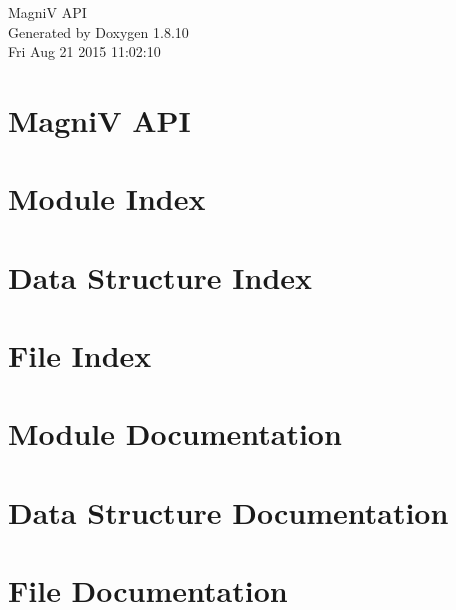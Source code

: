 \documentclass[twoside]{book}
\newcommand{\+}{\discretionary{\mbox{\scriptsize$\hookleftarrow$}}{}{}}
\newcommand{\clearemptydoublepage}{%
  \newpage{\pagestyle{empty}\cleardoublepage}%
}
\begin{document}
\hypersetup{pageanchor=false,
             bookmarks=true,
             bookmarksnumbered=true,
             pdfencoding=unicode
            }
\begin{titlepage}
\vspace*{7cm}
\begin{center}%
{\Large Magni\+V A\+P\+I }\\
\vspace*{1cm}
{\large Generated by Doxygen 1.8.10}\\
\vspace*{0.5cm}
{\small Fri Aug 21 2015 11:02:10}\\
\end{center}
\end{titlepage}
\clearemptydoublepage
\tableofcontents
\clearemptydoublepage
{}
\hypersetup{pageanchor=true}

\chapter{Magni\+V A\+P\+I}
\label{index}\hypertarget{index}{}
\chapter{Module Index}

\chapter{Data Structure Index}

\chapter{File Index}

\chapter{Module Documentation}





\chapter{Data Structure Documentation}
























\chapter{File Documentation}







\backmatter
\newpage
{}
\clearemptydoublepage
{}
\printindex
\end{document}
